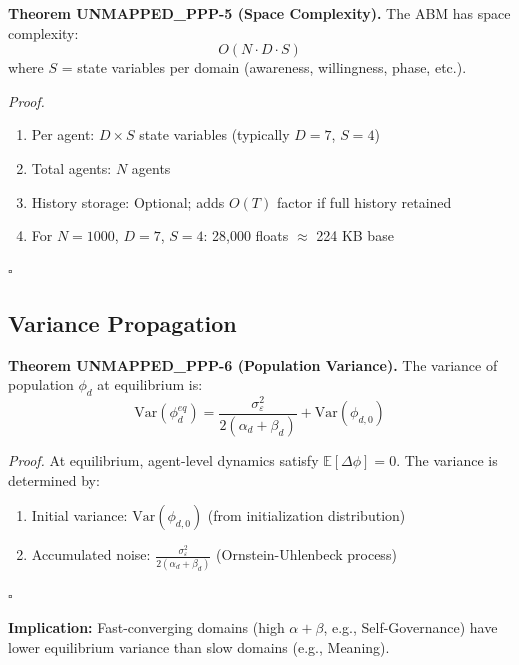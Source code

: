 \begin{tcolorbox}[colback=yellow!5!white, colframe=yellow!75!black, title=Theorem UNMAPPED_PPP-5: Space Complexity]
\textbf{Theorem UNMAPPED_PPP-5 (Space Complexity).}
The ABM has space complexity:
\begin{equation}
O(N \cdot D \cdot S)
\end{equation}
where $S$ = state variables per domain (awareness, willingness, phase, etc.).

\textit{Proof.}
\begin{enumerate}[nosep]
\item Per agent: $D \times S$ state variables (typically $D = 7$, $S = 4$)
\item Total agents: $N$ agents
\item History storage: Optional; adds $O(T)$ factor if full history retained
\item For $N = 1000$, $D = 7$, $S = 4$: 28,000 floats $\approx$ 224 KB base
\end{enumerate}
\hfill $\square$
\end{tcolorbox}

\subsection{Variance Propagation}

\begin{tcolorbox}[colback=green!5!white, colframe=green!75!black, title=Theorem UNMAPPED_PPP-6: Variance Propagation]
\textbf{Theorem UNMAPPED_PPP-6 (Population Variance).}
The variance of population $\phi_d$ at equilibrium is:
\begin{equation}
\text{Var}(\phi^{eq}_d) = \frac{\sigma^2_\varepsilon}{2(\alpha_d + \beta_d)} + \text{Var}(\phi_{d,0})
\label{eq:ppp-variance}
\end{equation}

\textit{Proof.}
At equilibrium, agent-level dynamics satisfy $\mathbb{E}[\Delta\phi] = 0$.
The variance is determined by:
\begin{enumerate}[nosep]
\item Initial variance: $\text{Var}(\phi_{d,0})$ (from initialization distribution)
\item Accumulated noise: $\frac{\sigma^2_\varepsilon}{2(\alpha_d + \beta_d)}$ (Ornstein-Uhlenbeck process)
\end{enumerate}
\hfill $\square$
\end{tcolorbox}

\textbf{Implication:} Fast-converging domains (high $\alpha + \beta$, e.g., Self-Governance) have
lower equilibrium variance than slow domains (e.g., Meaning).

